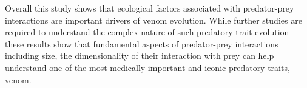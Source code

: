 Overall this study shows that ecological factors associated with predator-prey interactions are important drivers of venom evolution. While further studies are required to understand the complex nature of such predatory trait evolution these results show that fundamental aspects of predator-prey interactions including size, the dimensionality of their interaction with prey can help understand one of the most medically important and iconic predatory traits, venom.



%
%


